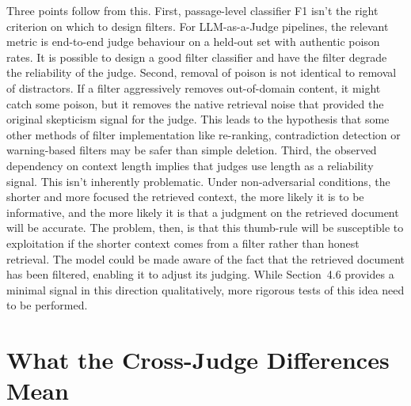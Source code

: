 Three points follow from this.
First, passage-level classifier F1 isn't the right criterion on which to design filters. For LLM-as-a-Judge pipelines, the relevant metric is end-to-end judge behaviour on a held-out set with authentic poison rates. It is possible to design a good filter classifier and have the filter degrade the reliability of the judge.
Second, removal of poison is not identical to removal of distractors. If a filter aggressively removes out-of-domain content, it might catch some poison, but it removes the native retrieval noise that provided the original skepticism signal for the judge. This leads to the hypothesis that some other methods of filter implementation like re-ranking, contradiction detection or warning-based filters may be safer than simple deletion.
Third, the observed dependency on context length implies that judges use length as a reliability signal. This isn't inherently problematic. Under non-adversarial conditions, the shorter and more focused the retrieved context, the more likely it is to be informative, and the more likely it is that a judgment on the retrieved document will be accurate. The problem, then, is that this thumb-rule will be susceptible to exploitation if the shorter context comes from a filter rather than honest retrieval. The model could be made aware of the fact that the retrieved document has been filtered, enabling it to adjust its judging. While Section~4.6 provides a minimal signal in this direction qualitatively, more rigorous tests of this idea need to be performed.

\section{What the Cross-Judge Differences Mean}
\label{sec:judge-calibration}

